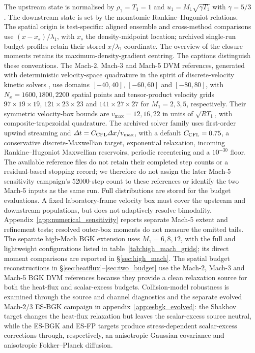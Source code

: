 \documentclass[lineno,paper]{JFM-FLM_Au}
\newenvironment{revision}{\nolinenumbers\begin{tcolorbox}[breakable,colback=revisionyellow,colframe=revisionyellow,boxrule=0pt,arc=0pt,left=5pt,right=5pt,top=5pt,bottom=5pt,before skip=6pt,after skip=6pt]\captionsetup{width=\linewidth}}{\end{tcolorbox}\linenumbers}
\newenvironment{revision}{}{}
\begin{document}
\begin{revision}
The upstream state is normalised by $\rho_1=T_1=1$ and $u_1=M_1\sqrt{\gamma T_1}$ with $\gamma=5/3$.  The downstream state is set by the monatomic Rankine--Hugoniot relations.  The spatial origin is test-specific: aligned ensemble and cross-method comparisons use $(x-x_s)/\lambda_1$, with $x_s$ the density-midpoint location; archived single-run budget profiles retain their stored $x/\lambda_1$ coordinate. The overview of the closure moments retains its maximum-density-gradient centring. The captions distinguish these conventions.  The Mach-2, Mach-3 and Mach-5 DVM references, generated with deterministic velocity-space quadrature in the spirit of discrete-velocity kinetic solvers \citep{Mieussens2000,FilbetJin2010,DimarcoPareschi2014}, use domains $[-40,40]$, $[-60,60]$ and $[-80,80]$, with $N_x=1600,1800,2200$ spatial points and tensor-product velocity grids $97\times19\times19$, $121\times23\times23$ and $141\times27\times27$ for $M_1=2,3,5$, respectively. Their symmetric velocity-box bounds are $v_{\max}=12,16,22$ in units of $\sqrt{RT_1}$, with composite-trapezoidal quadrature. The archived solver family uses first-order upwind streaming and $\Delta t=C_{\rm CFL}\Delta x/v_{\max}$, with a default $C_{\rm CFL}=0.75$, a conservative discrete-Maxwellian target, exponential relaxation, incoming Rankine--Hugoniot Maxwellian reservoirs, periodic recentering and a $10^{-30}$ floor. The available reference files do not retain their completed step counts or a residual-based stopping record; we therefore do not assign the later Mach-5 sensitivity campaign's 52000-step count to these references or identify the two Mach-5 inputs as the same run. Full distributions are stored for the budget evaluations. A fixed laboratory-frame velocity box must cover the upstream and downstream populations, but does not adaptively resolve bimodality. Appendix~\ref{app:numerical_sensitivity} reports separate Mach-5 extent and refinement tests; resolved outer-box moments do not measure the omitted tails. The separate high-Mach BGK extension uses $M_1=6,8,12$, with the full and lightweight configurations listed in table~\ref{tab:high_mach_grids}; its direct moment comparisons are reported in \S\ref{sec:high_mach}.  The spatial budget reconstructions in \S\ref{sec:heatflux}--\ref{sec:two_budget} use the Mach-2, Mach-3 and Mach-5 BGK DVM references because they provide a clean relaxation source for both the heat-flux and scalar-excess budgets.  Collision-model robustness is examined through the source and channel diagnostics and the separate evolved Mach-2/3 ES-BGK campaign in appendix~\ref{app:esbgk_evolved}: the Shakhov target changes the heat-flux relaxation but leaves the scalar-excess source neutral, while the ES-BGK and ES-FP targets produce stress-dependent scalar-excess corrections through, respectively, an anisotropic Gaussian covariance and anisotropic Fokker--Planck diffusion.
\end{revision}
\end{document}
